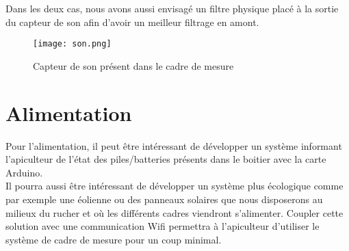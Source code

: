 Dans les deux cas, nous avons aussi envisagé un filtre physique placé à la sortie du capteur de son afin d'avoir un meilleur filtrage en amont.

\begin{figure}[h!]
\centering\texttt{[image: son.png]}
\caption{\label{fig:son} Capteur de son présent dans le cadre de mesure}
\end{figure}

\section{Alimentation}

Pour l'alimentation, il peut être intéressant de développer un système informant l'apiculteur de l'état des piles/batteries présents dans le boitier avec la carte Arduino. \\
Il pourra aussi être intéressant de développer un système plus écologique comme par exemple une éolienne ou des panneaux solaires que nous disposerons au milieux du rucher et où les différents cadres viendront s'alimenter. Coupler cette solution avec une communication Wifi permettra à l'apiculteur d'utiliser le système de cadre de mesure pour un coup minimal. 